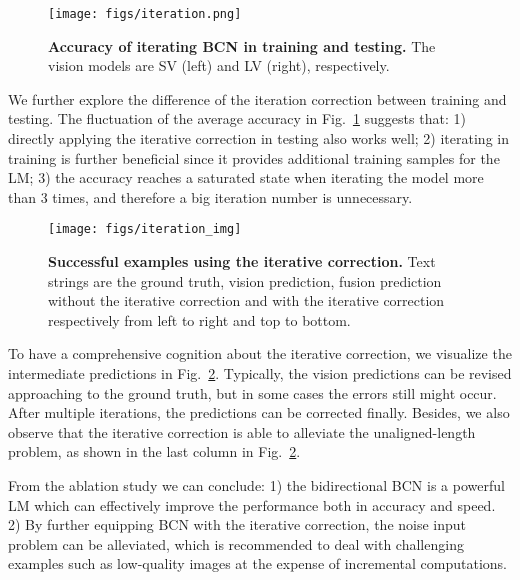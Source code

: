 \documentclass[10pt,journal,compsoc]{IEEEtran}
\begin{document}
\begin{figure}
   \begin{center}
      \texttt{[image: figs/iteration.png]}
      \caption{\textbf{Accuracy of iterating BCN in training and testing.} The vision models are SV (left) and LV (right), respectively.}
      \label{fig:iteration}
   \end{center}
   \vspace{-1.em} 
\end{figure}

We further explore the difference of the iteration correction between training and testing. The fluctuation of the average accuracy in Fig.~\ref{fig:iteration} suggests that: 1) directly applying the iterative correction in testing also works well; 2) iterating in training is further beneficial since it provides additional training samples for the LM; 3) the accuracy reaches a saturated state when iterating the model more than 3 times, and therefore a big iteration number is unnecessary.
 

\begin{figure}
   \begin{center}
      \texttt{[image: figs/iteration\_img]}
      \caption{\textbf{Successful examples using the iterative correction.} Text strings are the ground truth, vision prediction, fusion prediction without the iterative correction and with the iterative correction respectively from left to right and top to bottom.}
      \label{fig:iteration_img}
   \end{center}
   \vspace{-1.5em}      
\end{figure}

To have a comprehensive cognition about the iterative correction, we visualize the intermediate predictions in Fig.~\ref{fig:iteration_img}. Typically, the vision predictions can be revised approaching to the ground truth, but in some cases the errors still might occur. After multiple iterations, the predictions can be corrected finally. Besides, we also observe that the iterative correction is able to alleviate the unaligned-length problem, as shown in the last column in Fig.~\ref{fig:iteration_img}. 

From the ablation study we can conclude: 1) the bidirectional BCN is a powerful LM which can effectively improve the performance both in accuracy and speed. 2) By further equipping BCN with the iterative correction, the noise input problem can be alleviated, which is recommended to deal with challenging examples such as low-quality images at the expense of incremental computations.
\end{document}
